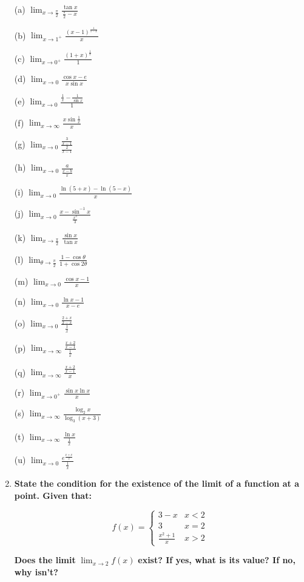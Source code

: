 \documentclass{article}
\begin{document}
\begin{enumerate}
(a) $\lim_{x \to \frac{\pi}{2}} \frac{\tan x}{\frac{\pi}{2} - x}$

(b) $\lim_{x \to 1^+} \frac{(x - 1)^{\frac{1}{1-x}}}{x}$

(c) $\lim_{x \to 0^+} \frac{(1 + x)^{\frac{1}{x}}}{1}$

(d) $\lim_{x \to 0} \frac{\cos x - e}{x \sin x}$

(e) $\lim_{x \to 0} \frac{\frac{1}{x} - \frac{1}{\sin x}}{1}$

(f) $\lim_{x \to \infty} \frac{x \sin \frac{1}{x}}{x}$

(g) $\lim_{x \to 0} \frac{\frac{3}{x - 1}}{\frac{2}{x - 1}}$

(h) $\lim_{x \to 0} \frac{a}{\frac{x - b}{x}}$

(i) $\lim_{x \to 0} \frac{\ln(5 + x) - \ln(5 - x)}{x}$

(j) $\lim_{x \to 0} \frac{x - \sin^{-1} x}{\frac{x^3}{3}}$

(k) $\lim_{x \to \frac{\pi}{2}} \frac{\sin x}{\tan x}$

(l) $\lim_{\theta \to \frac{\pi}{2}} \frac{1 - \cos \theta}{1 + \cos 2\theta}$

(m) $\lim_{x \to 0} \frac{\cos x - 1}{x}$

(n) $\lim_{x \to 0} \frac{\ln x - 1}{x - e}$

(o) $\lim_{x \to 0} \frac{\frac{2 + x}{2 - x}}{\frac{1}{x}}$

(p) $\lim_{x \to \infty} \frac{\frac{x + 2}{x - 1}}{\frac{1}{x}}$

(q) $\lim_{x \to \infty} \frac{\frac{x + 2}{x - 1}}{x}$

(r) $\lim_{x \to 0^+} \frac{\sin x \ln x}{x}$

(s) $\lim_{x \to \infty} \frac{\log_2 x}{\log_3 (x + 3)}$

(t) $\lim_{x \to \infty} \frac{\ln x}{\frac{1}{x}}$

(u) $\lim_{x \to 0} \frac{e^{\frac{x + x}{2}}}{\frac{1}{x}}$


\item \textbf{State the condition for the existence of the limit of a function at a point. Given that:}

\[f(x) =\begin{cases}3 - x & x < 2 \\3 & x = 2 \\\frac{x^2 + 1}{x} & x > 2\end{cases}\]

\textbf{Does the limit} $\lim_{x \to 2} f(x)$ \textbf{exist? If yes, what is its value? If no, why isn’t?}


\end{enumerate}
\end{document}
